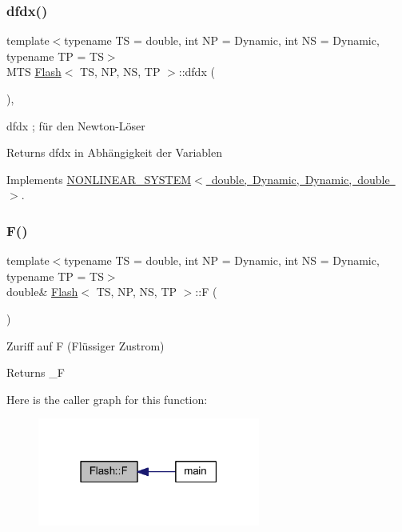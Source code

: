 \subsubsection{\texorpdfstring{dfdx()}{dfdx()}}
{\footnotesize\ttfamily template$<$typename TS = double, int NP = Dynamic, int NS = Dynamic, typename TP = TS$>$ \\
M\+TS \mbox{\hyperlink{class_flash}{Flash}}$<$ TS, NP, NS, TP $>$\+::dfdx (\begin{DoxyParamCaption}{ }\end{DoxyParamCaption})\hspace{0.3cm}{\ttfamily [inline]}, {\ttfamily [virtual]}}



dfdx ; für den Newton-\/\+Löser 

\begin{DoxyReturn}{Returns}
dfdx in Abhängigkeit der Variablen 
\end{DoxyReturn}


Implements \mbox{\hyperlink{class_n_o_n_l_i_n_e_a_r___s_y_s_t_e_m_a531f56bcbc77f2219164af40aa16fad2}{N\+O\+N\+L\+I\+N\+E\+A\+R\+\_\+\+S\+Y\+S\+T\+E\+M$<$ double, Dynamic, Dynamic, double $>$}}.

\mbox{\label{class_flash_ac44eff7052e26a0075c21b4f068e162e}} 
\subsubsection{\texorpdfstring{F()}{F()}}
{\footnotesize\ttfamily template$<$typename TS = double, int NP = Dynamic, int NS = Dynamic, typename TP = TS$>$ \\
double\& \mbox{\hyperlink{class_flash}{Flash}}$<$ TS, NP, NS, TP $>$\+::F (\begin{DoxyParamCaption}{ }\end{DoxyParamCaption})\hspace{0.3cm}{\ttfamily [inline]}}



Zuriff auf F (Flüssiger Zustrom) 

\begin{DoxyReturn}{Returns}
\+\_\+F 
\end{DoxyReturn}
Here is the caller graph for this function\+:\nopagebreak
\begin{figure}[H]
\begin{center}
\leavevmode
\includegraphics[width=207pt]{class_flash_ac44eff7052e26a0075c21b4f068e162e_icgraph}
\end{center}
\end{figure}
\mbox{\label{class_flash_ad29e755877ca96aa5b9f34a10d6cd8b2}} 
